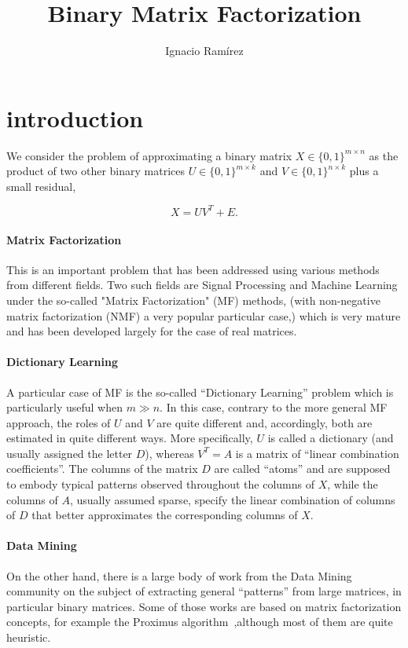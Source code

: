 \documentclass[a4paper,11pt]{report}
\title{Binary Matrix Factorization}
\author{Ignacio Ram\'{i}rez}
\begin{document}
\maketitle

\section*{introduction}

We consider the problem of approximating a binary matrix $X \in \{0,1\}^{m{\times}n}$ as the product of two other binary matrices $U \in \{0,1\}^{m{\times}k}$ and $V \in \{0,1\}^{n{\times}k}$ plus a small residual,

\begin{equation}
X = UV^T + E.
\label{eq:mf}
\end{equation}

\paragraph{Matrix Factorization} This is an important problem that has been addressed using various methods from different fields. Two such fields are Signal Processing and Machine Learning under the so-called "Matrix Factorization" (MF) methods, (with non-negative matrix factorization (NMF) a very popular particular case,) which is very mature and has been developed largely for the case of real matrices.

\paragraph{Dictionary Learning} A particular case of MF is the so-called ``Dictionary Learning'' problem which is particularly useful when $m \gg n$. In this case, contrary to the more general MF approach, the roles of $U$ and $V$ are quite different and, accordingly, both are estimated in quite different ways. More specifically, $U$ is called a dictionary (and usually assigned the letter $D$), whereas $V^T=A$ is a matrix of ``linear combination coefficients''. The columns of the matrix $D$ are called ``atoms'' and are supposed to embody typical patterns observed throughout the columns of $X$, while the columns of $A$, usually assumed sparse, specify the linear combination of columns of $D$ that better approximates the corresponding columns of $X$.

\paragraph{Data Mining} On the other hand, there is a large body of work from the Data Mining community on the subject of extracting general ``patterns'' from large matrices, in particular binary matrices. Some of those works are based on matrix factorization concepts, for example the Proximus algorithm~\cite{proximus},although most of them are quite heuristic.
\end{document}
